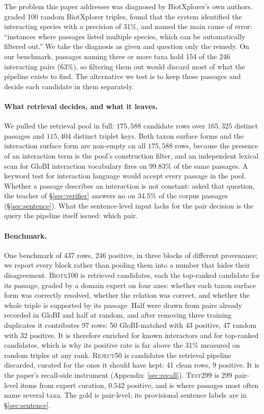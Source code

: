 \documentclass[11pt]{article}
\begin{document}
The problem this paper addresses was diagnosed by BiotXplorer's own authors.
\citet{ruch2024biotxplorer} graded 100 random BiotXplorer triples, found that the system identified
the interacting species with a precision of 31\%, and named the main cause of error: ``instances
where passages listed multiple species, which can be automatically filtered out.'' We take the
diagnosis as given and question only the remedy. On our benchmark, passages naming three or more
taxa hold 154 of the 246 interacting pairs (63\%), so filtering them out would discard most of what
the pipeline exists to find. The alternative we test is to keep those passages and decide each
candidate in them separately.

\paragraph{What retrieval decides, and what it leaves.}
We pulled the retrieval pool in full: $175{,}588$ candidate rows over $165{,}325$ distinct passages
and $115{,}404$ distinct triplet keys. Both taxon surface forms and the interaction surface form are
non-empty on all $175{,}588$ rows, because the presence of an interaction term is the pool's
construction filter, and an independent lexical scan for GloBI interaction vocabulary fires on
$99.83\%$ of the same passages. A keyword test for interaction language would accept every passage in
the pool. Whether a passage
describes an interaction is not constant: asked that question, the teacher of \S\ref{sec:verifier}
answers no on $34.5\%$ of the corpus passages (\S\ref{sec:sentence}). What the
sentence-level input lacks for the pair decision is the query the pipeline itself issued: which pair.

\paragraph{Benchmark.}
One benchmark of 437 rows, 246 positive, in three blocks of different provenance; we report every
block rather than pooling them into a number that hides their disagreement.
\textsc{Biotx100} is retrieved candidates, each the top-ranked candidate for its passage, graded by
a domain expert on four axes: whether each taxon surface form was correctly resolved, whether the
relation was correct, and whether the whole triple is supported by its passage. Half were drawn
from pairs already recorded in GloBI and half at random, and after removing three training
duplicates it contributes 97 rows: 50 GloBI-matched with 43 positive, 47 random with 32 positive.
It is therefore enriched for known interactors and for top-ranked candidates, which is why its
positive rate is far above the 31\% \citet{ruch2024biotxplorer} measured on random triples at any
rank. \textsc{Reject50} is candidates the
retrieval pipeline discarded, curated for the ones it should have kept: 41 clean rows, 9 positive.
It is the paper's recall-side instrument (Appendix~\ref{sec:recall}). \textsc{Test299} is 299 pair-level items from expert
curation, $0.542$ positive, and is where passages most often name several taxa. The gold
is pair-level; its provisional sentence labels are in \S\ref{sec:sentence}.
\end{document}
